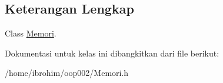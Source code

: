 \subsection{Keterangan Lengkap}
Class \hyperlink{classMemori}{Memori}. 

Dokumentasi untuk kelas ini dibangkitkan dari file berikut\+:\begin{DoxyCompactItemize}
\item 
/home/ibrohim/oop002/Memori.\+h\end{DoxyCompactItemize}
